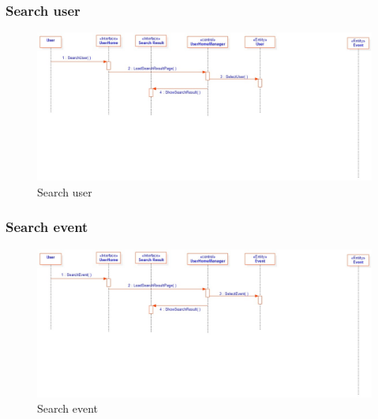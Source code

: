 \subsubsection{Search user}
\begin{figure}[tbh]
  \begin{center}
  \includegraphics[width=150mm]{12search}
    \caption{Search user}\label{Fig 1:}
  \end{center}
\end{figure}

\subsubsection{Search event}
\begin{figure}[tbh]
  \begin{center}
  \includegraphics[width=150mm]{13search}
    \caption{Search event}\label{Fig 1:}
  \end{center}
\end{figure}
\newpage
